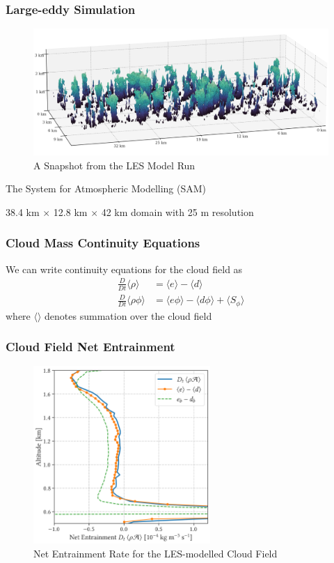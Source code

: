 \documentclass{beamer}
\begin{document}
\begin{frame}
    \frametitle{Large-eddy Simulation}
    \begin{figure}
        \centering
        \includegraphics[width=\textwidth]{img/les.png}
        \caption{ A Snapshot from the LES Model Run }
    \end{figure}
    The System for Atmospheric Modelling (SAM)

    38.4 km $\times$ 12.8 km $\times$ 42 km domain with 25 m resolution
\end{frame}

\begin{frame}
    \frametitle{Cloud Mass Continuity Equations}
    We can write continuity equations for the cloud field as
    \begin{align}
        \label{eq:mam}
        \frac{D}{D t} \langle \rho \rangle &= \langle e \rangle - \langle d \rangle
        \\
        \label{eq:mpm}
        \frac{D}{D t} \langle \rho \phi \rangle &= \langle e \phi \rangle - \langle d \phi \rangle + \langle S_\phi \rangle
    \end{align}
    where $\langle \rangle$ denotes summation over the cloud field
\end{frame}

\begin{frame}
    \frametitle{Cloud Field Net Entrainment}
    \begin{figure}
        \centering
        \includegraphics[width=0.6\textwidth]{img/nent.png}
        \caption{ Net Entrainment Rate for the LES-modelled Cloud Field }
    \end{figure}
\end{frame}
\end{document}
